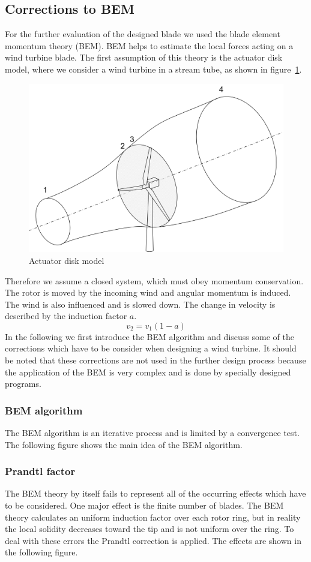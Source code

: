 \documentclass[10pt]{article}
\begin{document}
\subsection{Corrections to BEM}
For the further evaluation of the designed blade we used the blade element momentum theory (BEM). BEM helps to estimate the local forces acting on a wind turbine blade. The first assumption of this theory is the actuator disk model, where we consider a wind turbine in a stream tube, as shown in figure~\ref{fig:actuatordisk}.
\begin{figure}[H]
\centering
\includegraphics[width=0.6\linewidth]{../CIP_2/Figures/actuatordiskb.png}
\caption{Actuator disk model}
\label{fig:actuatordisk}
\end{figure}
Therefore we assume a closed system, which must obey momentum conservation. The rotor is moved by the incoming wind and angular momentum is induced. The wind is also influenced and is slowed down. The change in velocity is described by the induction factor $a$.
\begin{equation}
v_2 = v_1(1-a)
\end{equation}
In the following we first introduce the BEM algorithm and discuss some of the corrections which have to be consider when designing a wind turbine. It should be noted that these corrections are not used in the further design process because the application of the BEM is very complex and is done by specially designed programs.
\subsubsection{BEM algorithm}
The BEM algorithm is an iterative process and is limited by a convergence test. The following figure shows the main idea of the BEM algorithm.
\subsubsection{Prandtl factor}
The BEM theory by itself fails to represent all of the occurring effects which have to be considered. One major effect is the finite number of blades. The BEM theory calculates an uniform induction factor over each rotor ring, but in reality the local solidity decreases toward the tip and is not uniform over the ring. To deal with these errors the Prandtl correction is applied. The effects are shown in the following figure.
\end{document}

